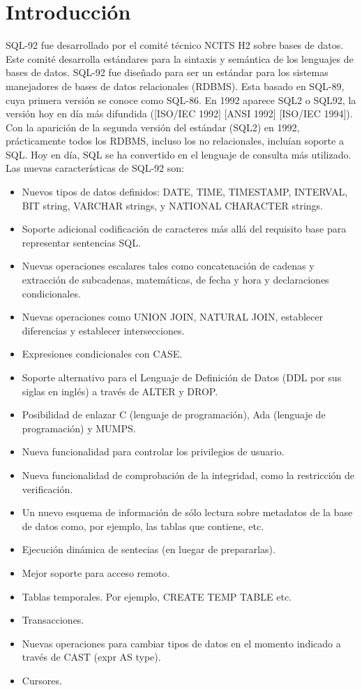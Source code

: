 \documentclass[preprint,12pt]{elsarticle}
\begin{document}
\section{Introducción} 
SQL-92 fue desarrollado por el comité técnico NCITS H2 sobre bases de datos. Este comité desarrolla estándares para la sintaxis y semántica de los lenguajes de bases de datos. SQL-92 fue diseñado para ser un estándar para los sistemas manejadores de bases de datos relacionales (RDBMS). Esta basado en SQL-89, cuya primera versión se conoce como SQL-86. En 1992 aparece SQL2 o SQL92, la versión hoy en día más difundida ([ISO/IEC 1992] [ANSI 1992] [ISO/IEC 1994]). Con la aparición de la segunda versión del estándar (SQL2) en 1992, prácticamente todos los RDBMS, incluso los no relacionales, incluían soporte a SQL. Hoy en día, SQL se ha convertido en el lenguaje de consulta más utilizado. Las nuevas características de SQL-92 son:
\begin{itemize}
\item Nuevos tipos de datos definidos: DATE, TIME, TIMESTAMP, INTERVAL, BIT string, VARCHAR strings, y NATIONAL CHARACTER strings.
\item Soporte adicional codificación de caracteres más allá del requisito base para representar sentencias SQL.
\item Nuevas operaciones escalares tales como concatenación de cadenas y extracción de subcadenas, matemáticas, de fecha y hora y declaraciones condicionales.
\item Nuevas operaciones como UNION JOIN, NATURAL JOIN, establecer diferencias y establecer intersecciones.
\item Expresiones condicionales con CASE.
\item Soporte alternativo para el Lenguaje de Definición de Datos (DDL por sus siglas en inglés) a través de ALTER y DROP.
\item Posibilidad de enlazar C (lenguaje de programación), Ada (lenguaje de programación) y MUMPS.
\item Nueva funcionalidad para controlar los privilegios de usuario.
\item Nueva funcionalidad de comprobación de la integridad, como la restricción de verificación.
\item Un nuevo esquema de información de sólo lectura sobre metadatos de la base de datos como, por ejemplo, las tablas que contiene, etc. 
\item Ejecución dinámica de sentecias (en luegar de prepararlas).
\item Mejor soporte para acceso remoto.
\item Tablas temporales. Por ejemplo, CREATE TEMP TABLE etc.
\item Transacciones.
\item Nuevas operaciones para cambiar tipos de datos en el momento indicado a través de CAST (expr AS type).
\item Cursores.

\end{itemize}
\end{document}
